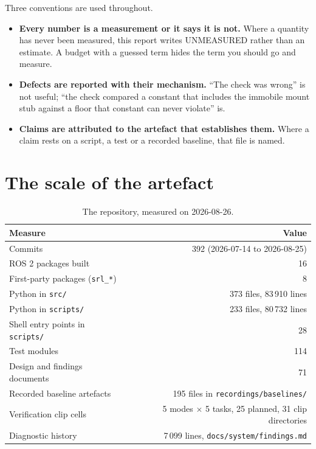 \documentclass[11pt,a4paper,oneside]{report}
\newcommand{\code}[1]{\texttt{\small #1}}
\newcommand{\file}[1]{\texttt{\small #1}}
\begin{document}
Three conventions are used throughout.

\begin{itemize}
\item \textbf{Every number is a measurement or it says it is not.} Where a
      quantity has never been measured, this report writes UNMEASURED rather
      than an estimate. A budget with a guessed term hides the term you should
      go and measure.
\item \textbf{Defects are reported with their mechanism.} ``The check was
      wrong'' is not useful; ``the check compared a constant that includes the
      immobile mount stub against a floor that constant can never violate'' is.
\item \textbf{Claims are attributed to the artefact that establishes them.}
      Where a claim rests on a script, a test or a recorded baseline, that
      file is named.
\end{itemize}

\section{The scale of the artefact}

\begin{table}[H]
\centering
\small
\begin{tabular}{@{}lr@{}}
\toprule
\textbf{Measure} & \textbf{Value} \\
\midrule
Commits & 392 (2026-07-14 to 2026-08-25) \\
ROS 2 packages built & 16 \\
First-party packages (\code{srl\_*}) & 8 \\
Python in \file{src/} & 373 files, 83\,910 lines \\
Python in \file{scripts/} & 233 files, 80\,732 lines \\
Shell entry points in \file{scripts/} & 28 \\
Test modules & 114 \\
Design and findings documents & 71 \\
Recorded baseline artefacts & 195 files in \file{recordings/baselines/} \\
Verification clip cells & 5 modes $\times$ 5 tasks, 25 planned, 31 clip directories \\
Diagnostic history & 7\,099 lines, \file{docs/system/findings.md} \\
\bottomrule
\end{tabular}
\caption{The repository, measured on 2026-08-26.}
\end{table}
\end{document}

